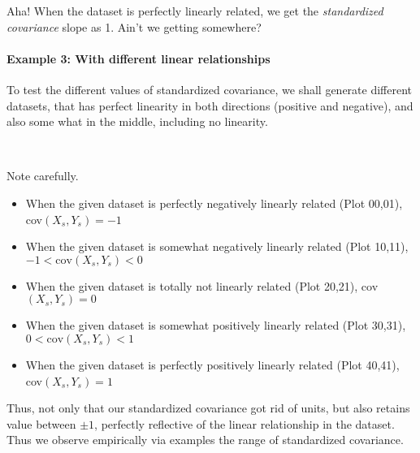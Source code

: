 \documentclass[float=false,crop=false]{standalone}
\begin{document}
    Aha! When the dataset is perfectly linearly related, we get the
\emph{standardized covariance} slope as 1. Ain't we getting somewhere?

    \paragraph{Example 3: With different linear
relationships}\label{example-3-with-different-linear-relationships}

To test the different values of standardized covariance, we shall
generate different datasets, that has perfect linearity in both
directions (positive and negative), and also some what in the middle,
including no linearity.
    \begin{center}
    \end{center}
    { \hspace*{\fill} \\}
    
Note carefully.  

\begin{itemize}
\item When the given dataset is perfectly negatively linearly related (Plot 00,01), cov$(X_s,Y_s) = -1$  
\item When the given dataset is somewhat negatively linearly related (Plot 10,11), $-1 < \mathrm{cov}(X_s,Y_s) < 0$
\item When the given dataset is totally not linearly related (Plot 20,21), cov$(X_s,Y_s) = 0$  
\item When the given dataset is somewhat positively linearly related (Plot 30,31), $0 < \mathrm{cov}(X_s,Y_s) < 1$  
\item When the given dataset is perfectly positively linearly related (Plot 40,41), cov$(X_s,Y_s) = 1$  
\end{itemize}


    Thus, not only that our standardized covariance got rid of units, but
also retains value between \(\pm 1\), perfectly reflective of the linear
relationship in the dataset. Thus we observe empirically via examples
the range of standardized covariance.


    
    
    
    
\end{document}
